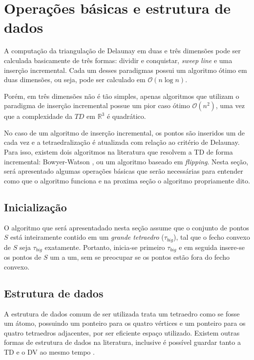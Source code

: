 \section{Operações básicas e estrutura de dados}

A computação da triangulação de Delaunay em duas e três dimensões pode
ser calculada basicamente de três formas: dividir e conquistar, \textit{sweep line}
e uma inserção incremental. Cada um desses paradigmas possui um algoritmo 
ótimo em duas dimensões, ou seja, pode ser calculado em $\mathcal{O}(n\log{}n)$.

Porém, em três dimensões não é tão simples, apenas algoritmos que utilizam 
o paradigma de inserção incremental possue um pior caso ótimo $\mathcal{O}(n^2)$,
uma vez que a complexidade da $TD$ em $\mathbb{R}^3$ é quadrático.

No caso de um algoritmo de inserção incremental, os pontos são inseridos um de 
cada vez e a tetraedralização é atualizada com relação ao critério de Delaunay.
Para isso, existem dois algoritmos na literatura que resolvem a TD de forma 
incremental: Bowyer-Watson \cite{Watson81}, ou um algoritmo baseado em 
\textit{flipping}. Nesta seção, será apresentado algumas operações básicas 
que serão necessárias para entender como que o algoritmo funciona e na 
proxima seção o algoritmo propriamente dito.

\subsection{Inicialização}
O algoritmo que será apresentadado nesta seção assume que o conjunto de 
pontos $S$ está inteiramente contido em um \textit{grande tetraedro} ($\tau_{big}$),
tal que o fecho convexo de $S$ seja $\tau_{big}$ exatamente. Portanto, inicia-se 
primeiro $\tau_{big}$ e em seguida insere-se os pontos de $S$ um a um, sem 
se preocupar se os pontos estão fora do fecho convexo. 

\subsection{Estrutura de dados}
A estrutura de dados comum de ser utilizada trata um tetraedro como se fosse 
um átomo, possuindo um ponteiro para os quatro vértices e um ponteiro 
para os quatro tetraedros adjacentes, por ser eficiente espaço
utilizado. Existem outras formas de estrutura de dados na literatura, inclusive
é possível guardar tanto a TD e o DV ao mesmo tempo \cite{Dobkin1987}.

